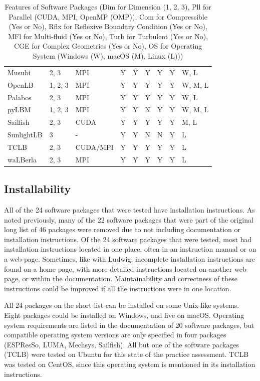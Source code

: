 \documentclass[final, 3p, times, authoryear]{elsarticle}
\begin{document}
\begin{table}
\begin{center}
\begin{tabular}{ p{3cm}llllllll}
			Musubi & 2, 3 & MPI & Y & Y & Y & Y & Y & W, L\\
			OpenLB & 1, 2, 3 & MPI & Y & Y & Y & Y & Y & W, M, L\\
			Palabos & 2, 3 & MPI & Y & Y & Y & Y & Y & W, L\\
			pyLBM & 1, 2, 3 & MPI & Y & Y & N & Y & Y & W, M, L\\
			Sailfish & 2, 3 & CUDA & Y & Y & Y & Y & Y & M, L\\
			SunlightLB & 3 & - & Y & Y & N & N & Y & L\\
			TCLB & 2, 3 & CUDA/MPI & Y & Y & Y & Y & Y & L\\
			waLBerla & 2, 3 & MPI & Y & Y & Y & Y & Y & L\\
			\bottomrule
		\end{tabular}
		\caption{Features of Software Packages (Dim for Dimension (1, 2, 3),
			Pll for Parallel (CUDA, MPI, OpenMP (OMP)), Com for Compressible (Yes or No), Rflx for
			Reflexive Boundary Condition (Yes or No), MFl for Multi-fluid (Yes or
			No), Turb for Turbulent (Yes or No), CGE for Complex Geometries (Yes or No), OS for Operating System (Windows (W), macOS (M), Linux (L)))} \label{tbl_features}
	\end{center}
\end{table}

\subsection{Installability}

All of the 24 software packages that were tested have installation instructions.
As noted previously, many of the 22 software packages that were part of the
original long list of 46 packages were removed due to not including
documentation or installation instructions. Of the 24 software packages that
were tested, most had installation instructions located in one place, often in
an instruction manual or on a web-page. Sometimes, like with Ludwig, incomplete
installation instructions are found on a home page, with more detailed
instructions located on another web-page, or within the documentation.
Maintainability and correctness of these instructions could be improved if all
the instructions were in one location. 

All 24 packages on the short list can be installed on some Unix-like systems.
Eight packages could be installed on Windows, and five on macOS. Operating
system requirements are listed in the documentation of 20 software packages, but
compatible operating system versions are only specified in four packages
(ESPResSo, LUMA, Mechsys, Sailfish). All but one of the software packages (TCLB)
were tested on Ubuntu for this state of the practice assessment. TCLB was tested
on CentOS, since this operating system is mentioned in its installation
instructions.
\end{document}
